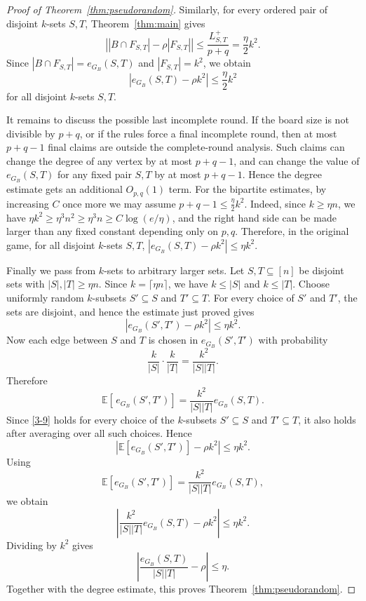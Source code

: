 \documentclass[10pt,a4paper]{amsart}
\begin{document}
\begin{proof}[Proof of Theorem~\ref{thm:pseudorandom}]
Similarly, for every ordered pair of disjoint $k$-sets $S,T$, Theorem~\ref{thm:main}
gives
\[
        \left|
        |B\cap F_{S,T}|-\rho |F_{S,T}|
        \right|
        \le
        \frac{L_{S,T}^+}{p+q}
        =
        \frac{\eta}{2}k^2.
\]
Since
$|B\cap F_{S,T}|=e_{G_B}(S,T)$
and $|F_{S,T}|=k^2$,
we obtain
\[
        \left|
        e_{G_B}(S,T)-\rho k^2
        \right|
        \le
        \frac{\eta}{2}k^2
\]
for all disjoint $k$-sets $S,T$.

It remains to discuss the possible last incomplete round.  If the board size is not
divisible by $p+q$, or if the rules force a final incomplete round, then at most
$p+q-1$ final claims are outside the complete-round analysis.  Such claims can change
the degree of any vertex by at most $p+q-1$, and can change the value of
$e_{G_B}(S,T)$ for any fixed pair $S,T$ by at most $p+q-1$.  Hence the degree estimate
gets an additional $O_{p,q}(1)$ term.  For the bipartite estimates, by increasing
$C$ once more we may assume
$p+q-1\le \frac{\eta}{2}k^2$.
Indeed, since $k\ge\eta n$, we have
$ \eta k^2\ge \eta^3 n^2\ge \eta^3 n\ge C\log(e/\eta)$,
and the right hand side can be made larger than any fixed constant depending only on
$p,q$.  Therefore, in the original game, for all disjoint $k$-sets $S,T$,
$\left|
        e_{G_B}(S,T)-\rho k^2
        \right|
        \le
        \eta k^2$.

Finally we pass from $k$-sets to arbitrary larger sets.  Let $S,T\subseteq[n]$ be
disjoint sets with
        $|S|,|T|\ge\eta n$.
Since $k=\lceil\eta n\rceil$, we have $k\le |S|$ and $k\le |T|$.  Choose uniformly
random $k$-subsets
$S'\subseteq S$ and
        $T'\subseteq T$.
For every choice of $S'$ and $T'$, the sets are disjoint, and hence the estimate just
proved gives
\begin{equation}\label{3-9}
\left|
        e_{G_B}(S',T')-\rho k^2
        \right|
        \le
        \eta k^2.
\end{equation}
Now each edge between $S$ and $T$ is
chosen in $e_{G_B}(S',T')$ with probability
\[
        \frac{k}{|S|}\cdot\frac{k}{|T|}
        =
        \frac{k^2}{|S||T|}.
\]
Therefore
\[
        \mathbb E[\,e_{G_B}(S',T')]
        =
        \frac{k^2}{|S||T|}e_{G_B}(S,T).
\]
Since \eqref{3-9}
holds for every choice of the \(k\)-subsets \(S'\subseteq S\) and
\(T'\subseteq T\), it also holds after averaging over all such choices. Hence
\[
        \left|
        \mathbb E [e_{G_B}(S',T')]-\rho k^2
        \right|
        \le
        \eta k^2 .
\]
Using
\[
        \mathbb E [e_{G_B}(S',T')]
        =
        \frac{k^2}{|S||T|}e_{G_B}(S,T),
\]
we obtain
\[
        \left|
        \frac{k^2}{|S||T|}e_{G_B}(S,T)-\rho k^2
        \right|
        \le
        \eta k^2 .
\]
Dividing by $k^2$ gives
\[
        \left|
        \frac{e_{G_B}(S,T)}{|S||T|}-\rho
        \right|
        \le
        \eta.
\]
Together with the degree estimate, this proves Theorem~\ref{thm:pseudorandom}.
\end{proof}
\end{document}
